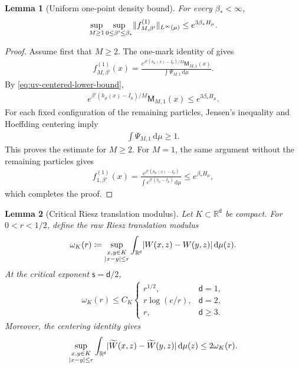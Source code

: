 \documentclass[11pt,reqno]{amsart}
\numberwithin{equation}{section}
\theoremstyle{plain}
\newtheorem{lemma}[lemma]{Lemma}
\theoremstyle{remark}
\DeclarePairedDelimiter{\abs}{\lvert}{\rvert}
\DeclarePairedDelimiter{\norm}{\lVert}{\rVert}
\renewcommand{\d}{\mathsf{d}}
\newcommand{\md}{\mathrm{d}}
\newcommand{\R}{{\mathbb{R}}}
\newcommand{\tl}{\widetilde}
\newcommand{\be}{\beta}
\newcommand{\s}{\mathsf{s}}
\begin{document}
\begin{lemma}[Uniform one-point density bound]
\label{lem:uv-uniform-one-point-bound}
For every \(\be_*<\infty\),
\begin{align}\label{eq:uv-uniform-one-point-bound}
 \sup_{M\ge1}\sup_{0\le\be'\le\be_*}
 \norm{f_{M,\be'}^{(1)}}_{L^\infty(\mu)}
 \le e^{3\be_*H_\mu}.
\end{align}
\end{lemma}

\begin{proof}
Assume first that \(M\ge2\).  The one-mark identity of  gives
\begin{align}\label{eq:uv-one-point-marked-representation}
 f_{M,\be'}^{(1)}(x)
 =\frac{
 e^{\be'(h_\mu(x)-I_\mu)/M}\mathsf M_{M,1}(x)}
 {\int\Psi_{M,1}\,\md\mu}.
\end{align}
By \eqref{eq:uv-centered-lower-bound},
\begin{align}\label{eq:uv-one-point-marked-numerator-bound}
 e^{\be'(h_\mu(x)-I_\mu)/M}\mathsf M_{M,1}(x)
 \le e^{3\be_*H_\mu}.
\end{align}
For each fixed configuration of the remaining particles, Jensen's inequality and Hoeffding centering imply
\begin{align}\label{eq:uv-one-point-marked-denominator-bound}
 \int\Psi_{M,1}\,\md\mu\ge1.
\end{align}
This proves the estimate for \(M\ge2\).  For \(M=1\), the same argument without the remaining particles gives
\begin{align}\label{eq:uv-one-point-M1-bound}
 f_{1,\be'}^{(1)}(x)
 =\frac{e^{\be'(h_\mu(x)-I_\mu)}}
 {\int e^{\be'(h_\mu-I_\mu)}\,\md\mu}
 \le e^{\be_*H_\mu},
\end{align}
which completes the proof.
\end{proof}

\begin{lemma}[Critical Riesz translation modulus]
\label{lem:uv-riesz-translation-modulus}
Let \(K\subset\R^\d\) be compact.  For \(0<r<1/2\), define the raw Riesz translation modulus
\begin{align}\label{eq:uv-translation-modulus-def}
 \omega_K(r)
 \coloneqq
 \sup_{\substack{x,y\in K\\\abs{x-y}\le r}}
 \int_{\R^\d}\abs{W(x,z)-W(y,z)}\,\md\mu(z).
\end{align}
At the critical exponent \(\s=\d/2\),
\begin{align}\label{eq:uv-translation-modulus-bound}
 \omega_K(r)\le C_K
 \begin{cases}
 r^{1/2},&\d=1,\\
 r\log(e/r),&\d=2,\\
 r,&\d\ge3.
 \end{cases}
\end{align}
Moreover, the centering identity gives
\begin{align}\label{eq:uv-centered-translation-modulus-bound}
 \sup_{\substack{x,y\in K\\\abs{x-y}\le r}}
 \int_{\R^\d}\abs{\tl W(x,z)-\tl W(y,z)}\,\md\mu(z)
 \le2\omega_K(r).
\end{align}
\end{lemma}
\end{document}
